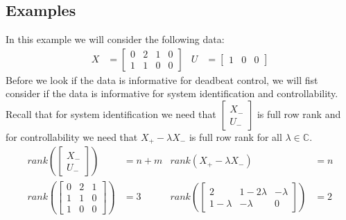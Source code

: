 \subsection{Examples}
In this example we will consider the following data:
\begin{align*} X &= \begin{bmatrix} 0&2&1&0\\1&1&0&0 \end{bmatrix} & U &= \begin{bmatrix} 1&0&0 \end{bmatrix}\end{align*} 
Before we look if the data is informative for deadbeat control, we will fist consider if the data is informative for system identification and controllability. Recall that for system identification we need that $\begin{bmatrix} X_- \\ U_- \end{bmatrix}$ is full row rank and for controllability we need that $X_+ - \lambda X_-$ is full row rank for all $\lambda \in \mathbb{C}$.
\begin{align*}
rank(\begin{bmatrix} X_- \\ U_- \end{bmatrix}) &= n + m & rank(X_+ - \lambda X_-) &= n \\
rank(\begin{bmatrix} 0&2&1\\1&1&0\\1&0&0 \end{bmatrix}) &= 3 & rank(\begin{bmatrix} 2&1 - 2\lambda &-\lambda\\1-\lambda&-\lambda&0 \end{bmatrix}) &= 2
\end{align*}

